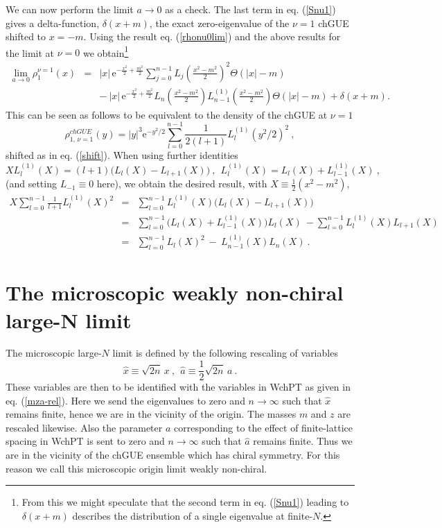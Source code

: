 \documentclass[11pt]{article}
\newcommand{\be}{\begin{equation}}
\newcommand{\ee}{\end{equation}}
\newcommand{\bea}{\begin{eqnarray}}
\newcommand{\eea}{\end{eqnarray}}
\newcommand{\nn}{\nonumber}
\newcommand{\e}{\mbox{e}}
\newcommand{\hx}{\hat{x}}
\newcommand{\ha}{\hat{a}}
\newcommand{\sect}[1]{\setcounter{equation}{0}\section{#1}}
\begin{document}
We can now perform the limit $a\to0$ as a check. The last term in
eq. (\ref{Snu1}) gives a delta-function, $\delta(x+m)$, the exact
zero-eigenvalue of the $\nu=1$ chGUE shifted to $x=-m$. Using the
result eq. (\ref{rhonu0lim}) and the above results for the limit at
$\nu=0$ we obtain\footnote{From this we might speculate that the second
term in eq. (\ref{Snu1}) leading to $\delta(x+m)$ describes the
distribution of a single eigenvalue at finite-$N$.}
\bea
\lim_{a\to0}\rho^{\nu=1}_1(x)&=& |x|\,\e^{-\frac{x^2}{2}+\frac{m^2}{2}}
\sum_{j=0}^{n-1}L_j\left(\frac{x^2-m^2}{2}\right)^2\Theta(|x|-m)\nn\\
&& -\ |x| \,\e^{-\frac{x^2}{2}+\frac{m^2}{2}}L_n\left(\frac{x^2-m^2}{2}\right)
L^{(1)}_{n-1}\left(\frac{x^2-m^2}{2}\right)\Theta(|x|-m) 
+\delta(x+m).
\eea
This can be seen as follows to be equivalent to the density of the chGUE at
$\nu=1$
\be
\rho_{1,\,\nu=1}^{chGU\!E}(y)= |y|^3
\e^{-y^2/2}\sum_{l=0}^{n-1}\frac{1}{2(l+1)}L_l^{(1)}(y^2/2)^2 \ ,
\label{rhochGUEnu1}
\ee
shifted as in eq. (\ref{shift}). When using further identities \cite{Grad}
\be
XL_l^{(1)}(X)= (l+1)\Big(L_l(X)-L_{l+1}(X) \Big)\ ,\ \ L_l^{(1)}(X)=
L_l(X)+L_{l-1}^{(1)}(X)\ ,
\ee
(and setting $L_{-1}\equiv0$ here), we obtain the desired result, with
$X\equiv\frac12 (x^2-m^2)$, 
\bea
X\sum_{l=0}^{n-1}\frac{1}{l+1}L_l^{(1)}(X)^2 &=&
\sum_{l=0}^{n-1}L_l^{(1)}(X)\Big(L_l(X)-L_{l+1}(X) 
\Big)\nn\\
&=&  \sum_{l=0}^{n-1}\Big(L_l(X)+L_{l-1}^{(1)}(X)\Big)L_l(X) \ -
\sum_{l=0}^{n-1}L_l^{(1)}(X)L_{l+1}(X)\nn\\ 
&=&  \sum_{l=0}^{n-1}L_l(X)^2 \ -\ L_{n-1}^{(1)}(X)L_n(X)\ .
\eea




\sect{The microscopic weakly non-chiral large-N limit}\label{largeN}

The microscopic large-$N$ limit is defined by the following rescaling
of variables 
\be
\hat{x}\equiv \sqrt{2n}\,x\ ,\ \
\hat{a}\equiv \frac12\sqrt{2n}\,a \ .
\label{micro}
\ee
These variables are then to be identified with the variables in WchPT
as given in eq. (\ref{mza-rel}).
Here we send the eigenvalues to zero and $n\to\infty$ such that $\hx$
remains finite, hence we are in the vicinity of the origin. The masses
$m$ and $z$ are rescaled likewise. 
Also the parameter $a$ corresponding to the effect of finite-lattice
spacing in WchPT is sent to zero and $n\to\infty$ such that $\ha$
remains finite. Thus we are in the vicinity of the chGUE 
ensemble which has chiral symmetry. For this reason we call this microscopic
origin limit weakly non-chiral. 
\end{document}
